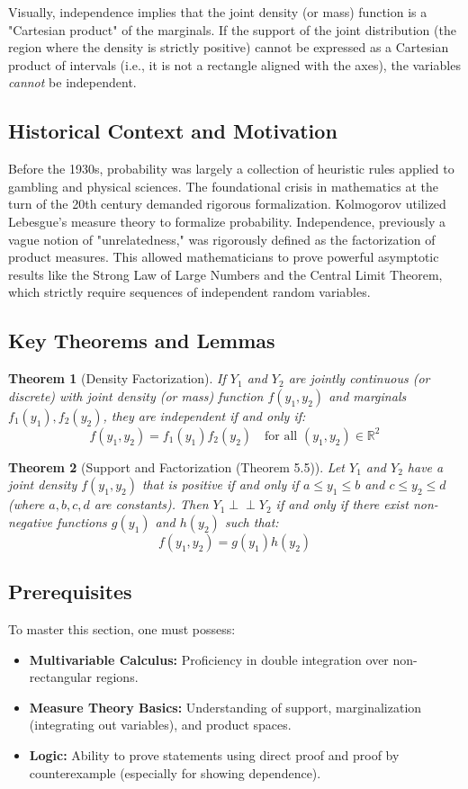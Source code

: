 \documentclass[11pt, a4paper]{article}
\newtheorem{theorem}{Theorem}[section]
\theoremstyle{definition}
\theoremstyle{remark}
\newcommand{\R}{\mathbb{R}}
\newcommand{\indep}{\perp\!\!\!\perp}
\begin{document}
Visually, independence implies that the joint density (or mass) function is a "Cartesian product" of the marginals. If the support of the joint distribution (the region where the density is strictly positive) cannot be expressed as a Cartesian product of intervals (i.e., it is not a rectangle aligned with the axes), the variables \textit{cannot} be independent.

\subsection{Historical Context and Motivation}
Before the 1930s, probability was largely a collection of heuristic rules applied to gambling and physical sciences. The foundational crisis in mathematics at the turn of the 20th century demanded rigorous formalization. Kolmogorov utilized Lebesgue's measure theory to formalize probability. Independence, previously a vague notion of "unrelatedness," was rigorously defined as the factorization of product measures. This allowed mathematicians to prove powerful asymptotic results like the Strong Law of Large Numbers and the Central Limit Theorem, which strictly require sequences of independent random variables.

\subsection{Key Theorems and Lemmas}

\begin{theorem}[Density Factorization]
If $Y_1$ and $Y_2$ are jointly continuous (or discrete) with joint density (or mass) function $f(y_1, y_2)$ and marginals $f_1(y_1), f_2(y_2)$, they are independent if and only if:
\[ f(y_1, y_2) = f_1(y_1)f_2(y_2) \quad \text{for all } (y_1, y_2) \in \R^2 \]
\end{theorem}

\begin{theorem}[Support and Factorization (Theorem 5.5)]
Let $Y_1$ and $Y_2$ have a joint density $f(y_1, y_2)$ that is positive if and only if $a \le y_1 \le b$ and $c \le y_2 \le d$ (where $a,b,c,d$ are constants). Then $Y_1 \indep Y_2$ if and only if there exist non-negative functions $g(y_1)$ and $h(y_2)$ such that:
\[ f(y_1, y_2) = g(y_1)h(y_2) \]
\end{theorem}

\subsection{Prerequisites}
To master this section, one must possess:
\begin{itemize}
    \item \textbf{Multivariable Calculus:} Proficiency in double integration over non-rectangular regions.
    \item \textbf{Measure Theory Basics:} Understanding of support, marginalization (integrating out variables), and product spaces.
    \item \textbf{Logic:} Ability to prove statements using direct proof and proof by counterexample (especially for showing dependence).
\end{itemize}
\end{document}
